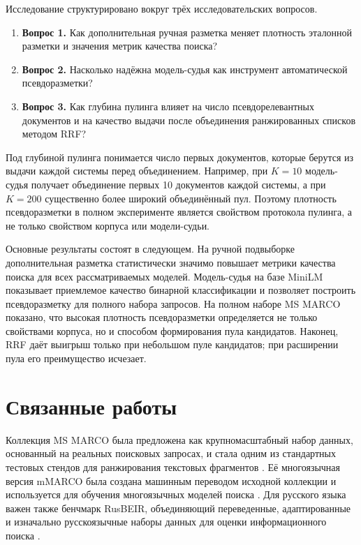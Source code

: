 \documentclass[runningheads,a4paper]{llncs}
\begin{document}
Исследование структурировано вокруг трёх исследовательских вопросов.
\begin{enumerate}
\item \textbf{Вопрос 1.} Как дополнительная ручная разметка меняет плотность эталонной разметки и значения метрик качества поиска?
\item \textbf{Вопрос 2.} Насколько надёжна модель-судья как инструмент автоматической псевдоразметки?
\item \textbf{Вопрос 3.} Как глубина пулинга влияет на число псевдорелевантных документов и на качество выдачи после объединения ранжированных списков методом RRF?
\end{enumerate}

Под глубиной пулинга понимается число первых документов, которые берутся из выдачи каждой системы перед объединением. Например, при $K=10$ модель-судья получает объединение первых 10 документов каждой системы, а при $K=200$ \textemdash{} существенно более широкий объединённый пул. Поэтому плотность псевдоразметки в полном эксперименте является свойством протокола пулинга, а не только свойством корпуса или модели-судьи.

Основные результаты состоят в следующем. На ручной подвыборке дополнительная разметка статистически значимо повышает метрики качества поиска для всех рассматриваемых моделей. Модель-судья на базе MiniLM \cite{wang2020minilm,reimers2019sentencebert} показывает приемлемое качество бинарной классификации и позволяет построить псевдоразметку для полного набора запросов. На полном наборе MS MARCO показано, что высокая плотность псевдоразметки определяется не только свойствами корпуса, но и способом формирования пула кандидатов. Наконец, RRF даёт выигрыш только при небольшом пуле кандидатов; при расширении пула его преимущество исчезает.

\section{Связанные работы}

Коллекция MS MARCO была предложена как крупномасштабный набор данных, основанный на реальных поисковых запросах, и стала одним из стандартных тестовых стендов для ранжирования текстовых фрагментов \cite{bajaj2016msmarco}. Её многоязычная версия mMARCO была создана машинным переводом исходной коллекции и используется для обучения многоязычных моделей поиска \cite{bonifacio2022mmarco}. Для русского языка важен также бенчмарк RusBEIR, объединяющий переведенные, адаптированные и изначально русскоязычные наборы данных для оценки информационного поиска \cite{2025rusbeir}.
\end{document}
